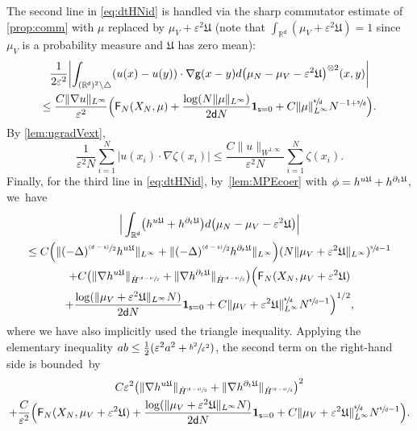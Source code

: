 \documentclass[10pt]{amsart}
\newcommand{\psfrac}[2]{\sfrac{(#1)}{#2}}
\theoremstyle{plain}
\theoremstyle{definition}
\DeclarePairedDelimiter{\pa}{\lparen}{\rparen}
\newcommand{\Bpa}[1]{\Bigl(#1\Bigr)}
\let\div\relax
\DeclareMathOperator{\div}{\mathrm{div}}
\newcommand{\R}{{\mathbb{R}}}
\let\vep\varepsilon
\let\p\partial
\let\ux X
\newcommand{\indic}{\mathbf{1}}
\newcommand{\Uu}{\mathfrak{U}}
\newcommand{\Fr}{\mathsf{F}}
\renewcommand{\d}{\mathsf{d}}
\newcommand{\g}{{\mathsf{g}}}
\newcommand{\s}{\mathsf{s}}
\begin{document}
The second line in \eqref{eq:dtHNid} is handled via the sharp commutator estimate of \cref{prop:comm} with $\mu$ replaced by $\mu_V+\vep^2\Uu$ (note that $\int_{\R^\d}(\mu_V+\vep^2\Uu) = 1$ since $\mu_V$ is a probability measure and $\Uu$ has zero mean):\vspace*{-5pt}
\begin{multline}\label{eq:LGronpot}
\frac{1}{2\vep^2}\biggl|\int_{(\R^\d)^2\setminus\triangle} \pa*{u(x)-u(y)}\cdot\nabla\g(x-y)d\pa*{\mu_N-\mu_V-\vep^2\Uu}^{\otimes 2}(x,y) \biggr| \\
\leq \frac{C\|\nabla u\|_{L^\infty}}{\vep^2}\Bpa{\Fr_N (\ux_N,\mu) + \frac{\log(N\|\mu\|_{L^\infty})}{2\d N}\indic_{\s=0} + C \|\mu\|_{L^\infty}^{\sfrac{\s}{\d}} N^{-1+\sfrac{\s}{\d}}}.
\end{multline}
By \cref{lem:ugradVext},\vspace*{-5pt}
\begin{equation}\label{eq:LGronzeta}
\frac{1}{\vep^2N}\sum_{i=1}^N|u(x_i)\cdot \nabla\zeta(x_i)| \leq \frac{C\|u\|_{W^{1,\infty}}}{\vep^2N}\sum_{i=1}^N \zeta(x_i).
\end{equation}
Finally, for the third line in \eqref{eq:dtHNid}, by~\cref{lem:MPEcoer} with $\phi = \div h^{u\Uu}+h^{\p_t\Uu}$, we~have\vspace*{-5pt}
\begin{multline}\label{eq:LGronRem}
\Big|\int_{\R^\d}\pa*{\div h^{u\Uu}+h^{\p_t\Uu}}d\pa*{\mu_N-\mu_V-\vep^2\Uu}\Big| \\
\leq C\pa*{\|(-\Delta)^{\psfrac{\d-\s}{2}}\div h^{u\Uu}\|_{L^\infty}+\|(-\Delta)^{\psfrac{\d-\s}{2}}h^{\p_t\Uu}\|_{L^\infty}}(N\|{\mu_V+\vep^2\Uu}\|_{L^\infty})^{\sfrac{\s}{\d}-1} \\
+ C\pa*{\|\nabla\div h^{u\Uu}\|_{\dot{H}^{\psfrac{\d-\s}{2}}} + \|\nabla h^{\p_t\Uu}\|_{\dot{H}^{\psfrac{\d-\s}{2}}}}\Big(\Fr_N(\ux_N,\mu_V+\vep^2\Uu)\\
+ \frac{\log(\|\mu_V+\vep^2\Uu\|_{L^\infty}N)}{2\d N}\indic_{\s=0} + C\|\mu_V+\vep^2\Uu\|_{L^\infty}^{\sfrac{\s}{\d}}N^{\sfrac{\s}{\d}-1}\Big)^{1/2},
\end{multline}
where we have also implicitly used the triangle inequality.
Applying the elementary inequality $ ab \le \frac12 (\vep^2 a^2+\sfrac{b^2}{ \vep^2})$, the second term on the right-hand side is bounded~by\vspace*{-8pt}
\begin{multline}\label{eq:prelog}
C\vep^2\pa*{\|\nabla\div h^{u\Uu}\|_{\dot{H}^{\psfrac{\d-\s}{2}}} + \|\nabla h^{\p_t\Uu}\|_{\dot{H}^{\psfrac{\d-\s}{2}}}}^2 \\
+ \frac{C}{\vep^2}\Big(\Fr_N(\ux_N,\mu_V+\vep^2\Uu) + \frac{\log(\|\mu_V+\vep^2\Uu\|_{L^\infty}N)}{2\d N}\indic_{\s=0}+ C\|\mu_V+\vep^2\Uu\|_{L^\infty}^{\sfrac{\s}{\d}}N^{\sfrac{\s}{\d}-1}\Big).
\end{multline}
\end{document}
